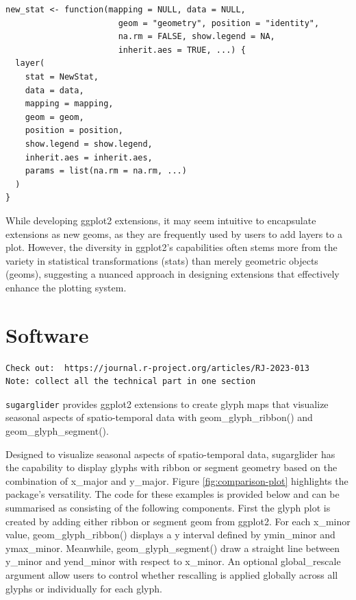 \begin{verbatim}
new_stat <- function(mapping = NULL, data = NULL, 
                       geom = "geometry", position = "identity", 
                       na.rm = FALSE, show.legend = NA, 
                       inherit.aes = TRUE, ...) {
  layer(
    stat = NewStat, 
    data = data, 
    mapping = mapping, 
    geom = geom, 
    position = position, 
    show.legend = show.legend, 
    inherit.aes = inherit.aes, 
    params = list(na.rm = na.rm, ...)
  )
}
\end{verbatim}

While developing ggplot2 extensions, it may seem intuitive to encapsulate extensions as new geoms, as they are frequently used by users to add layers to a plot. However, the diversity in ggplot2's capabilities often stems more from the variety in statistical transformations (stats) than merely geometric objects (geoms), suggesting a nuanced approach in designing extensions that effectively enhance the plotting system.

\hypertarget{software}{%
\section{Software}\label{software}}

\begin{verbatim}
Check out:  https://journal.r-project.org/articles/RJ-2023-013
Note: collect all the technical part in one section
\end{verbatim}

\texttt{sugarglider} provides ggplot2 extensions to create glyph maps that visualize seasonal aspects of spatio-temporal data with geom\_glyph\_ribbon() and geom\_glyph\_segment().

Designed to visualize seasonal aspects of spatio-temporal data, sugarglider has the capability to display glyphs with ribbon or segment geometry based on the combination of x\_major and y\_major. Figure \ref{fig:comparison-plot} highlights the package's versatility. The code for these examples is provided below and can be summarised as consisting of the following components. First the glyph plot is created by adding either ribbon or segment geom from ggplot2. For each x\_minor value, geom\_glyph\_ribbon() displays a y interval defined by ymin\_minor and ymax\_minor. Meanwhile, geom\_glyph\_segment() draw a straight line between y\_minor and yend\_minor with respect to x\_minor. An optional global\_rescale argument allow users to control whether rescalling is applied globally across all glyphs or individually for each glyph.

